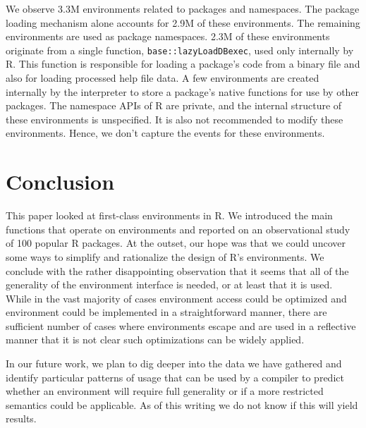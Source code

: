 \documentclass[10pt,review,sigplan,anonymous=true,authorversion=true,nonacm=true]{acmart}
\newcommand{\code}[1]{\lstinline |#1|\xspace}
\begin{document}
We observe 3.3M environments related to packages and namespaces. The package
loading mechanism alone accounts for 2.9M of these environments. The remaining
environments are used as package namespaces. 2.3M of these environments
originate from a single function, \code{base::lazyLoadDBexec}, used only
internally by R. This function is responsible for loading a package's code from
a binary file and also for loading processed help file data. A few environments
are created internally by the interpreter to store a package's native functions
for use by other packages. The namespace APIs of R are private, and the internal
structure of these environments is unspecified. It is also not recommended to
modify these environments. Hence, we don't capture the events for these
environments.

\section{Conclusion}

This paper looked at first-class environments in R. We introduced the main
functions that operate on environments and reported on an observational study of
100 popular R packages. At the outset, our hope was that we could uncover some
ways to simplify and rationalize the design of R's environments. We conclude
with the rather disappointing observation that it seems that all of the
generality of the environment interface is needed, or at least that it is used.
While in the vast majority of cases environment access could be optimized and
environment could be implemented in a straightforward manner, there are
sufficient number of cases where environments escape and are used in a
reflective manner that it is not clear such optimizations can be widely applied.

In our future work, we plan to dig deeper into the data we have gathered and
identify particular patterns of usage that can be used by a compiler to predict
whether an environment will require full generality or if a more restricted
semantics could be applicable. As of this writing we do not know if this will
yield results.


\end{document}
